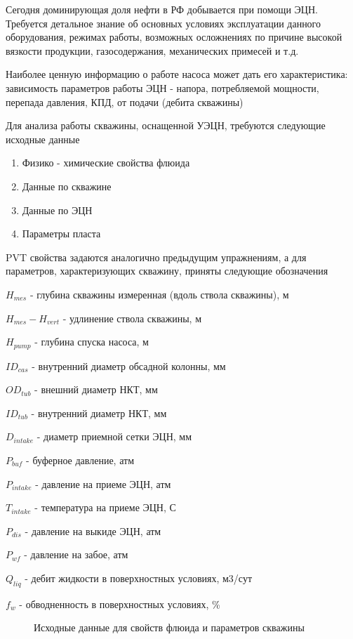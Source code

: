 Сегодня доминирующая доля нефти в РФ добывается при помощи ЭЦН. Требуется детальное знание об основных условиях эксплуатации данного оборудования, режимах работы, возможных осложнениях по причине высокой вязкости продукции, газосодержания, механических примесей и т.д.

Наиболее ценную информацию о работе насоса может дать его характеристика: зависимость параметров работы ЭЦН - напора, потребляемой мощности, перепада давления, КПД, от подачи (дебита скважины)

Для анализа работы скважины, оснащенной УЭЦН, требуются следующие исходные данные

\begin{enumerate}
	\item Физико - химические свойства флюида
	\item Данные по скважине
	\item Данные по ЭЦН
	\item Параметры пласта
\end{enumerate}

PVT свойства задаются аналогично предыдущим упражнениям, а для параметров, характеризующих скважину, приняты следующие обозначения

$H_{mes}$ - глубина скважины измеренная (вдоль ствола скважины), м

$H_{mes}- H_{vert}$ - удлинение ствола скважины, м

$H_{pump}$ - глубина спуска насоса, м

$ID_{cas}$ - внутренний диаметр обсадной колонны, мм

$OD_{tub}$ - внешний диаметр НКТ, мм

$ID_{tub}$ - внутренний диаметр НКТ, мм

$D_{intake}$ - диаметр приемной сетки ЭЦН, мм

$P_{buf}$ - буферное давление, атм

$P_{intake}$ - давление на приеме ЭЦН, атм

$T_{intake}$ - температура на приеме ЭЦН, С

$P_{dis}$ - давление на выкиде ЭЦН, атм

$P_{wf}$ - давление на забое, атм

$Q_{liq}$ - дебит жидкости в поверхностных условиях, м3/сут

$f_w$ - обводненность в поверхностных условиях, \%

\begin{figure}[h!]
	\center{\texttt{[image: Ex70\_1]}}
	\caption{Исходные данные для свойств флюида и параметров скважины}
	\label{ris:Ex70_1}
\end{figure}

